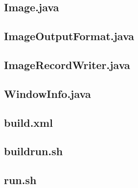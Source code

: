 \documentclass[12pt,a4paper]{extarticle} %
\begin{document}
\subsection*{Image.java}

\subsection*{ImageOutputFormat.java}

\subsection*{ImageRecordWriter.java}

\subsection*{WindowInfo.java}

\subsection*{build.xml}

\subsection*{buildrun.sh}

\subsection*{run.sh}

%
%
\end{document}
